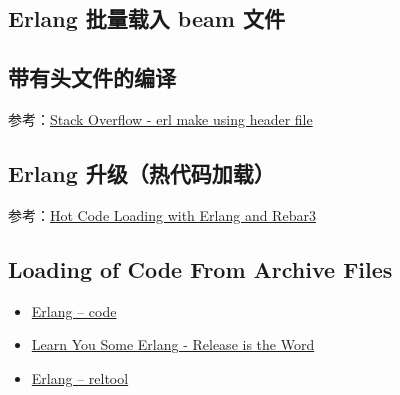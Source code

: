 \subsection{Erlang 批量载入 beam 文件}

\subsection{带有头文件的编译}

参考：\href{https://stackoverflow.com/questions/74700492/erl-make-using-header-file}{Stack Overflow - erl make using header file}

\subsection{Erlang 升级（热代码加载）}

参考：\href{https://medium.com/@kansi/hot-code-loading-with-erlang-and-rebar3-8252af16605b}{Hot Code Loading with Erlang and Rebar3}

\subsection{Loading of Code From Archive Files}

\begin{itemize}[leftmargin=1.5em]
    \item \href{https://www.erlang.org/doc/man/code.html#loading-of-code-from-archive-files}{Erlang -- code}
    \item \href{https://learnyousomeerlang.com/release-is-the-word}{Learn You Some Erlang - Release is the Word}
    \item \href{https://www.erlang.org/doc/man/reltool.html}{Erlang -- reltool}
\end{itemize}
